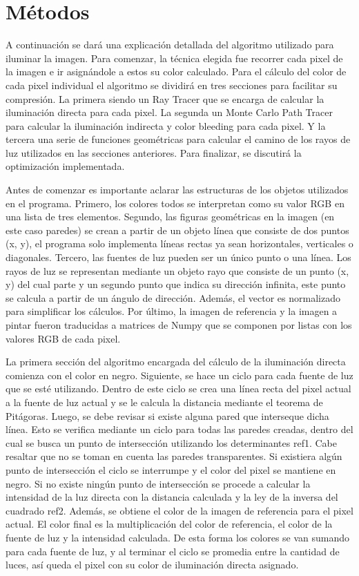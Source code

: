 \documentclass[conference]{IEEEtran}
\begin{document}
\section{Métodos}
A continuación se dará una explicación detallada del algoritmo utilizado para iluminar la imagen. Para comenzar, la técnica elegida fue recorrer cada pixel de la imagen e ir asignándole a estos su color calculado. Para el cálculo del color de cada pixel individual el algoritmo se dividirá en tres secciones para facilitar su compresión. La primera siendo un Ray Tracer que se encarga de calcular la iluminación directa para cada pixel. La segunda un Monte Carlo Path Tracer para calcular la iluminación indirecta y color bleeding para cada pixel. Y la tercera una serie de funciones geométricas para calcular el camino de los rayos de luz utilizados en las secciones anteriores. Para finalizar, se discutirá la optimización implementada. 

Antes de comenzar es importante aclarar las estructuras de los objetos utilizados en el programa. Primero, los colores todos se interpretan como su valor RGB en una lista de tres elementos. Segundo, las figuras geométricas en la imagen (en este caso paredes) se crean a partir de un objeto línea que consiste de dos puntos (x, y), el programa solo implementa líneas rectas ya sean horizontales, verticales o diagonales. Tercero, las fuentes de luz pueden ser un único punto o una línea. Los rayos de luz se representan mediante un objeto rayo que consiste de un punto (x, y) del cual parte y un segundo punto que indica su dirección infinita, este punto se calcula a partir de un ángulo de dirección. Además, el vector es normalizado para simplificar los cálculos. Por último, la imagen de referencia y la imagen a pintar fueron traducidas a matrices de Numpy que se componen por listas con los valores RGB de cada pixel. 

La primera sección del algoritmo encargada del cálculo de la iluminación directa comienza con el color en negro. Siguiente, se hace un ciclo para cada fuente de luz que se esté utilizando. Dentro de este ciclo se crea una línea recta del pixel actual a la fuente de luz actual y se le calcula la distancia mediante el teorema de Pitágoras. Luego, se debe revisar si existe alguna pared que interseque dicha línea. Esto se verifica mediante un ciclo para todas las paredes creadas, dentro del cual se busca un punto de intersección utilizando los determinantes ref1. Cabe resaltar que no se toman en cuenta las paredes transparentes. Si existiera algún punto de intersección el ciclo se interrumpe y el color del pixel se mantiene en negro. Si no existe ningún punto de intersección se procede a calcular la intensidad de la luz directa con la distancia calculada y la ley de la inversa del cuadrado ref2. Además, se obtiene el color de la imagen de referencia para el pixel actual. El color final es la multiplicación del color de referencia, el color de la fuente de luz y la intensidad calculada. De esta forma los colores se van sumando para cada fuente de luz, y al terminar el ciclo se promedia entre la cantidad de luces, así queda el pixel con su color de iluminación directa asignado. 
\end{document}
